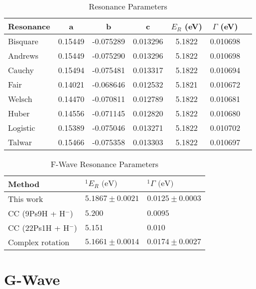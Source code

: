 \documentclass[Dissertation.tex]{subfiles}
\begin{document}
\setlength{\abovecaptionskip}{6pt}
\setlength{\belowcaptionskip}{6pt}
\begin{table}[H]
\centering
\begin{tabular}{l c c c c c c}
\toprule
Resonance & a & b & c & $E_R$ (eV) & $\Gamma$ (eV) \\
\midrule
Bisquare	& 0.15449 & -0.075289 & 0.013296 & 5.1822 & 0.010698 \\
Andrews		& 0.15449 & -0.075290 & 0.013296 & 5.1822 & 0.010698 \\
Cauchy		& 0.15494 & -0.075481 & 0.013317 & 5.1822 & 0.010694 \\
Fair			& 0.14021 & -0.068646 & 0.012532 & 5.1821 & 0.010672 \\ 
Welsch		& 0.14470 & -0.070811 & 0.012789 & 5.1822 & 0.010681 \\
Huber			& 0.14556 & -0.071145 & 0.012820 & 5.1822 & 0.010680 \\
Logistic	& 0.15389 & -0.075046 & 0.013271 & 5.1822 & 0.010702 \\ 
Talwar		& 0.15466 & -0.075358 & 0.013303 & 5.1822 & 0.010697 \\
\bottomrule
\end{tabular}
\caption{Resonance Parameters} %
\label{tab:FWaveResonanceFull}
\end{table}


\setlength{\abovecaptionskip}{6pt}   %
\setlength{\belowcaptionskip}{6pt}   %
\begin{table}[H]
\centering
\begin{tabular}{l l l}
\toprule
Method & $^1E_R \text{ (eV)}$ & $^1\Gamma \text{ (eV)}$ \\
\midrule
This work & $5.1867 \pm 0.0021$ & $0.0125 \pm 0.0003$ \\
CC (9Ps9H + H$^-$) \cite{Walters2004} & $5.200$ & $0.0095$ \\
CC (22Ps1H + H$^-$) \cite{Blackwood2002b} & $5.151$ & $0.010$ \\
Complex rotation \cite{Ho2000} & $5.1661 \pm 0.0014$ & $0.0174 \pm 0.0027$  \\
\bottomrule
\end{tabular}
\caption{F-Wave Resonance Parameters} %
\label{tab:FWaveResonanceComparisons}
\end{table}




\section{G-Wave}
\label{sec:GWave}
\end{document}
